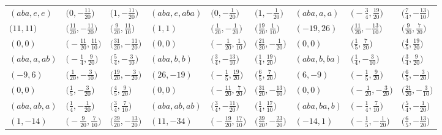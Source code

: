 \documentclass[pdftex]{sigma}
\theoremstyle{definition}
\numberwithin{equation}{section}
\begin{document}
\begin{landscape}
\begin{table}[th]
\begin{tabular}{|lll|lll|lll|}
\\\hline
$(aba, e, e)$ & $\bigl(0, -\frac{11}{20}\bigr)$ & $\bigl(1, -\frac{11}{20}\bigr)$ & $(aba, e, aba)$ & $\bigl(0, -\frac{1}{20}\bigr)$ & $\bigl(1, -\frac{1}{20}\bigr)$ & $(aba, a, a)$ & $\bigl(-\frac{3}{4}, \frac{19}{20}\bigr)$ & $\bigl(\frac{7}{4}, -\frac{13}{10}\bigr)$
\\
$\bigl(11, 11\bigr)$ & $\bigl(\frac{11}{20}, -\frac{11}{20}\bigr)$ & $\bigl(\frac{9}{20}, \frac{11}{10}\bigr)$ & $(1, 1)$ & $\bigl(\frac{1}{20}, -\frac{1}{20}\bigr)$ & $\bigl(\frac{19}{20}, \frac{1}{10}\bigr)$ & $(-19, 26)$ & $\bigl(\frac{11}{20}, -\frac{13}{10}\bigr)$ & $\bigl(\frac{9}{20}, \frac{7}{20}\bigr)$
\\
$(0, 0)$ & $\bigl(-\frac{11}{20}, \frac{11}{10}\bigr)$ & $\bigl(\frac{31}{20}, -\frac{11}{20}\bigr)$ & $(0, 0)$ & $\bigl(-\frac{1}{20}, \frac{1}{10}\bigr)$ & $\bigl(\frac{21}{20}, -\frac{1}{20}\bigr)$ & $(0, 0)$ & $\bigl(\frac{1}{5}, \frac{7}{20}\bigr)$ & $\bigl(\frac{4}{5}, \frac{19}{20}\bigr)$
\\\hline
$(aba, a, ab)$ & $\bigl(-\frac{1}{4}, \frac{9}{20}\bigr)$ & $\bigl(\frac{5}{4}, -\frac{3}{10}\bigr)$ & $(aba, b, b)$ & $\bigl(\frac{3}{4}, -\frac{13}{10}\bigr)$ & $\bigl(\frac{1}{4}, \frac{19}{20}\bigr)$ & $(aba, b, ba)$ & $\bigl(\frac{1}{4}, -\frac{3}{10}\bigr)$ & $\bigl(\frac{3}{4}, \frac{9}{20}\bigr)$
 \\
$(-9, 6)$ & $\bigl(\frac{1}{20}, -\frac{3}{10}\bigr)$ & $\bigl(\frac{19}{20}, -\frac{3}{20}\bigr)$ & $(26, -19)$ & $\bigl(-\frac{1}{5}, \frac{19}{20}\bigr)$ & $\bigl(\frac{6}{5}, \frac{7}{20}\bigr)$ & $(6, -9)$ & $\bigl(-\frac{1}{5}, \frac{9}{20}\bigr)$ & $\bigl(\frac{6}{5}, -\frac{3}{20}\bigr)$
\\
$(0, 0)$ & $\bigl(\frac{1}{5}, -\frac{3}{20}\bigr)$ & $\bigl(\frac{4}{5}, \frac{9}{20}\bigr)$ & $(0, 0)$ & $\bigl(-\frac{11}{20}, \frac{7}{20}\bigr)$ & $\bigl(\frac{31}{20}, -\frac{13}{10}\bigr)$ & $(0, 0)$ & $\bigl(-\frac{1}{20}, -\frac{3}{20}\bigr)$ & $\bigl(\frac{21}{20}, -\frac{3}{10}\bigr)$
\\\hline
$(aba, ab, a)$ & $\bigl(\frac{1}{4}, -\frac{1}{20}\bigr)$ & $\bigl(\frac{3}{4}, \frac{7}{10}\bigr)$ & $(aba, ab, ab)$ & $\bigl(\frac{3}{4}, -\frac{11}{20}\bigr)$ & $\bigl(\frac{1}{4}, \frac{17}{10}\bigr)$ & $(aba, ba, b)$ & $\bigl(-\frac{1}{4}, \frac{7}{10}\bigr)$ & $\bigl(\frac{5}{4}, -\frac{1}{20}\bigr)$
\\
$(1, -14)$ & $\bigl(-\frac{9}{20}, \frac{7}{10}\bigr)$ & $\bigl(\frac{29}{20}, -\frac{13}{20}\bigr)$ & $(11, -34)$ & $\bigl(-\frac{19}{20}, \frac{17}{10}\bigr)$ & $\bigl(\frac{39}{20}, -\frac{23}{20}\bigr)$ & $(-14, 1)$ & $\bigl(-\frac{1}{5}, -\frac{1}{20}\bigr)$ & $\bigl(\frac{6}{5}, -\frac{13}{20}\bigr)$

\end{tabular}
\end{table}
\end{landscape}
\end{document}

